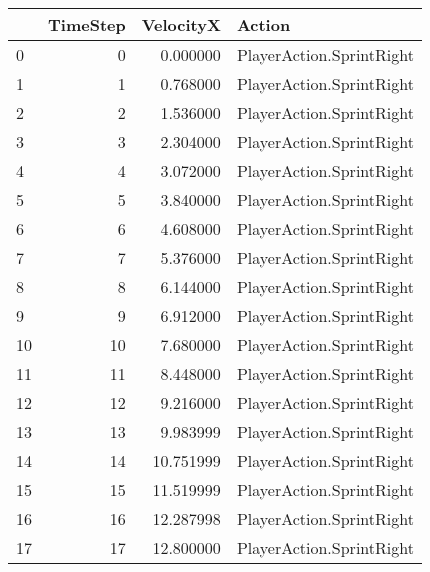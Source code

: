\begin{tabular}{lrrl}
\toprule
 & TimeStep & VelocityX & Action \\
\midrule
0 & 0 & 0.000000 & PlayerAction.SprintRight \\
1 & 1 & 0.768000 & PlayerAction.SprintRight \\
2 & 2 & 1.536000 & PlayerAction.SprintRight \\
3 & 3 & 2.304000 & PlayerAction.SprintRight \\
4 & 4 & 3.072000 & PlayerAction.SprintRight \\
5 & 5 & 3.840000 & PlayerAction.SprintRight \\
6 & 6 & 4.608000 & PlayerAction.SprintRight \\
7 & 7 & 5.376000 & PlayerAction.SprintRight \\
8 & 8 & 6.144000 & PlayerAction.SprintRight \\
9 & 9 & 6.912000 & PlayerAction.SprintRight \\
10 & 10 & 7.680000 & PlayerAction.SprintRight \\
11 & 11 & 8.448000 & PlayerAction.SprintRight \\
12 & 12 & 9.216000 & PlayerAction.SprintRight \\
13 & 13 & 9.983999 & PlayerAction.SprintRight \\
14 & 14 & 10.751999 & PlayerAction.SprintRight \\
15 & 15 & 11.519999 & PlayerAction.SprintRight \\
16 & 16 & 12.287998 & PlayerAction.SprintRight \\
17 & 17 & 12.800000 & PlayerAction.SprintRight \\
\bottomrule
\end{tabular}
